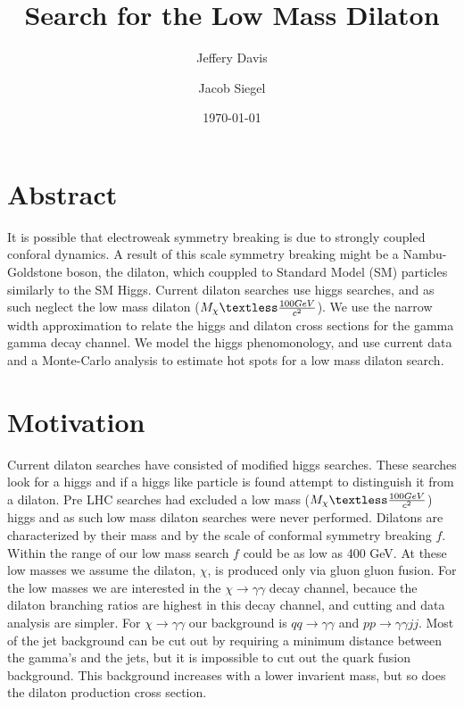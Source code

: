 \documentclass[twocolumn]{article}
\author{Jeffery Davis \and Jacob Siegel}
\date{\today}
\title{Search for the Low Mass Dilaton}
\begin{document}
\maketitle
\section{Abstract}
It is possible that electroweak symmetry breaking is due to strongly coupled conforal dynamics. A result of this scale symmetry breaking might be a Nambu-Goldstone boson, the dilaton, which couppled to Standard Model (SM) particles similarly to the SM Higgs. Current dilaton searches use higgs searches, and as such neglect the low mass dilaton (\begin{math}M_{\chi} \textless \frac{100 GeV}{c^{2}}\end{math}). We use the narrow width approximation to relate the higgs and dilaton cross sections for the gamma gamma decay channel. We model the higgs phenomonology, and use current data and a Monte-Carlo analysis to estimate hot spots for a low mass dilaton search. 
\section{Motivation}
Current dilaton searches have consisted of modified higgs searches. These searches look for a higgs and if a higgs like particle is found attempt to distinguish it from a dilaton. Pre LHC searches had excluded a low mass (\begin{math}M_{\chi} \textless \frac{100 GeV}{c^{2}}\end{math}) higgs and as such low mass dilaton searches were never performed. Dilatons are characterized by their mass and by the scale of conformal symmetry breaking \begin{math} f \end{math}. Within the range of our low mass search \begin{math} f \end{math} could be as low as 400 GeV. At these low masses we assume the dilaton, \begin{math} \chi \end{math}, is produced only via gluon gluon fusion. For the low masses we are interested in the \begin{math} \chi \rightarrow \gamma \gamma \end{math} decay channel, becauce the dilaton branching ratios are highest in this decay channel, and cutting and data analysis are simpler. For \begin{math} \chi \rightarrow \gamma \gamma \end{math} our background is \begin{math} q q \rightarrow \gamma \gamma \end{math} and \begin{math} p p  \rightarrow \gamma \gamma j j \end{math}. Most of the jet background can be cut out by requiring a minimum distance between the gamma's and the jets, but it is impossible to cut out the quark fusion background. This background increases with a lower invarient mass, but so does the dilaton production cross section.  
\end{document}
